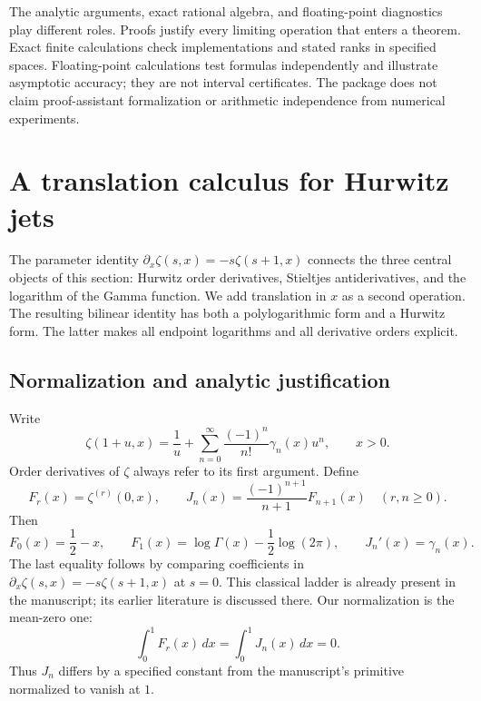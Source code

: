 \documentclass[11pt,a4paper]{article}
\numberwithin{equation}{section}
\theoremstyle{definition}
\theoremstyle{remark}
\begin{document}
The analytic arguments, exact rational algebra, and floating-point
diagnostics play different roles. Proofs justify every limiting operation
that enters a theorem. Exact finite calculations check implementations
and stated ranks in specified spaces. Floating-point calculations test
formulas independently and illustrate asymptotic accuracy; they are not
interval certificates. The package does not claim proof-assistant
formalization or arithmetic independence from numerical experiments.



\section{A translation calculus for Hurwitz jets}
\label{sec:translation}

The parameter identity $\partial_x\zeta(s,x)=-s\zeta(s+1,x)$
connects the three central objects of this section: Hurwitz order derivatives,
Stieltjes antiderivatives, and the logarithm of the Gamma function.
We add translation in $x$ as a second operation. The resulting bilinear
identity has both a polylogarithmic form and a Hurwitz form. The latter
makes all endpoint logarithms and all derivative orders explicit.

\subsection{Normalization and analytic justification}

Write
\begin{equation}\label{eq:stieltjes-def}
 \zeta(1+u,x)=\frac1u+\sum_{n=0}^{\infty}
              \frac{(-1)^n}{n!}\gamma_n(x)u^n,
 \qquad x>0.
\end{equation}
Order derivatives of $\zeta$ always refer to its first argument. Define
\begin{equation}\label{eq:FJ}
 F_r(x)=\zeta^{(r)}(0,x),\qquad
 J_n(x)=\frac{(-1)^{n+1}}{n+1}F_{n+1}(x)
 \quad(r,n\geq0).
\end{equation}
Then
\[
 F_0(x)=\frac12-x,\qquad
 F_1(x)=\log\Gamma(x)-\frac12\log(2\pi),\qquad J_n'(x)=\gamma_n(x).
\]
The last equality follows by comparing coefficients in
$\partial_x\zeta(s,x)=-s\zeta(s+1,x)$ at $s=0$. This classical ladder is
already present in the manuscript; its earlier literature is discussed
there. Our normalization is the mean-zero one:
\begin{equation}\label{eq:mean-zero}
 \int_0^1F_r(x)\,dx=\int_0^1J_n(x)\,dx=0.
\end{equation}
Thus $J_n$ differs by a specified constant from the manuscript's primitive
normalized to vanish at $1$.
\end{document}
